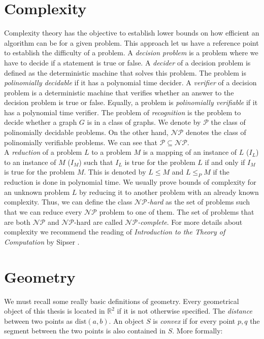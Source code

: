 \section{Complexity}

Complexity theory has the objective to establish lower bounds on how efficient an algorithm can be for a given problem. This approach let us have a reference point to establish the difficulty of a problem. A \emph{decision problem} is a problem where we have to decide if a statement is true or false. A \emph{decider} of a decision problem is defined as the deterministic machine that solves this problem. The problem is \emph{polinomially decidable} if it has a polynomial time decider. A \emph{verifier} of a decision problem is a deterministic machine that verifies whether an answer to the decision problem is true or false. Equally, a problem is \emph{polinomially verifiable} if it has a polynomial time verifier. The problem of \emph{recognition} is the problem to decide whether a graph $G$ is in a class of graphs. We denote by $\mathcal{P}$ the class of polinomially decidable problems. On the other hand, $\mathcal{NP}$ denotes the class of polinomially verifiable problems. We can see that $\mathcal{P} \subseteq \mathcal{NP}$.\\

A \emph{reduction} of a problem $L$ to a problem $M$ is a mapping of an instance of $L$ ($I_L$) to an instance of $M$ ($I_M$) such that $I_L$ is true for the problem $L$ if and
only if $I_M$ is true for the problem $M$. This is denoted by $L \leq M$ and $L \leq_P M$ if the reduction is done in polynomial time. We usually prove bounds of complexity for an unknown problem $L$ by reducing it to another problem with an already known complexity. Thus, we can define the class \emph{$\mathcal{NP}$-hard} as the set of problems such that we can reduce every $\mathcal{NP}$ problem to one of them. The set of problems that are both $\mathcal{NP}$ and $\mathcal{NP}$-hard are called \emph{$\mathcal{NP}$-complete}. For more details about complexity we recommend the reading of \textit{Introduction to the Theory of Computation} by Sipser \cite{sipserIntroductionTheoryComputation2006}.

\section{Geometry}

We must recall some really basic definitions of geometry. Every geometrical object of this thesis is located in $\mathbb{R}^2$ if it is not otherwise specified. The \emph{distance} between two points as $\text{dist}(a,b)$. An object $S$ is \emph{convex} if for every point $p,q$ the segment between the two points is also contained in $S$. More formally:

